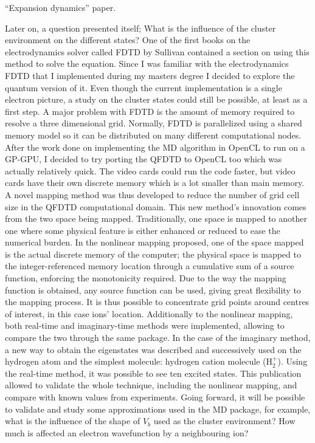 ``Expansion dynamics'' paper.


Later on, a question presented itself; What is the influence of the cluster
environment on the different states? One of the first books on the
electrodynamics solver called FDTD by Sullivan contained a section on using
this method to solve the \schrodinger equation. Since I was familiar with
the electrodynamics FDTD that I implemented during my masters degree I decided
to explore the quantum version of it. Even though the current implementation is
a single electron picture, a study on the cluster states could still be possible,
at least as a first step. A major problem with FDTD is the amount of memory
required to resolve a three dimensional grid. Normally, FDTD is parallelized
using a shared memory model so it can be distributed on many different
computational nodes. After the work done on implementing the MD algorithm in
OpenCL to run on a GP-GPU, I decided to try porting the QFDTD to OpenCL too
which was actually relatively quick. The video cards could run the code faster,
but video cards have their own discrete memory which is a lot smaller than main
memory. A novel mapping method was thus developed to reduce the number of grid
cell size in the QFDTD computational domain. This new method's innovation comes
from the two space being mapped. Traditionally, one space is mapped to another
one where some physical feature is either enhanced or reduced to ease the numerical
burden. In the nonlinear mapping proposed, one of the space mapped is the actual
discrete memory of the computer; the physical space is mapped to the
integer-referenced memory location through a cumulative sum of a source function,
enforcing the monotonicity required. Due to the way the mapping function is
obtained, any source function can be used, giving great flexibility to the
mapping process. It is thus possible to concentrate grid points around centres
of interest, in this case ions' location. Additionally to the nonlinear mapping,
both real-time and imaginary-time methods were implemented, allowing to compare
the two through the same package. In the case of the imaginary method, a new
way to obtain the eigenstates was described and successively used on the
hydrogen atom and the simplest molecule: hydrogen cation molecule (H$_{2}^{+}$).
Using the real-time method, it was possible to see ten excited states. This
publication allowed to validate the whole technique, including the nonlinear
mapping, and compare with known values from experiments. Going forward, it will
be possible to validate and study some approximations used in the MD package,
for example, what is the influence of the shape of $V_b$ used as the cluster
environment? How much is affected an electron wavefunction by a neighbouring
ion?

